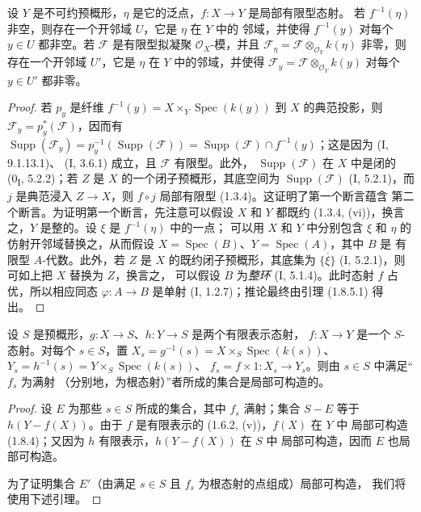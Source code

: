 \begin{corollary}[1.8.6]
\label{IV.1.8.6-fr}
设 $Y$ 是不可约预概形，$\eta$ 是它的泛点，$f:X\to Y$ 是局部有限型态射。
若 $f^{-1}(\eta)$ 非空，则存在一个开邻域 $U$，它是 $\eta$ 在 $Y$ 中的
邻域，并使得 $f^{-1}(y)$ 对每个 $y\in U$ 都非空。若 $\mathscr F$ 是有限型拟凝聚
$\mathcal O_X$-模，并且 $\mathscr F_\eta=\mathscr F\otimes_{\mathcal O_Y}k(\eta)$
非零，则存在一个开邻域 $U'$，它是 $\eta$ 在 $Y$ 中的邻域，并使得
$\mathscr F_y=\mathscr F\otimes_{\mathcal O_Y}k(y)$ 对每个 $y\in U'$ 都非零。
\end{corollary}

\begin{proof}
若 $p_y$ 是纤维 $f^{-1}(y)=X\times_Y\operatorname{Spec}(k(y))$ 到 $X$
的典范投影，则 $\mathscr F_y=p_y^*(\mathscr F)$，因而有
$\operatorname{Supp}(\mathscr F_y)=p_y^{-1}(\operatorname{Supp}(\mathscr F))
=\operatorname{Supp}(\mathscr F)\cap f^{-1}(y)$；这是因为 (I, 9.1.13.1)、
(I, 3.6.1) 成立，且 $\mathscr F$ 有限型。此外，
$\operatorname{Supp}(\mathscr F)$ 在 $X$ 中是闭的 (0\textsubscript{I},
5.2.2)；若 $Z$ 是 $X$ 的一个闭子预概形，其底空间为
$\operatorname{Supp}(\mathscr F)$ (I, 5.2.1)，而 $j$ 是典范浸入
$Z\to X$，则 $f\circ j$ 局部有限型 (1.3.4)。这证明了第一个断言蕴含
第二个断言。为证明第一个断言，先注意可以假设 $X$ 和 $Y$ 都既约
(1.3.4, (vi))，换言之，$Y$ 是整的。设 $\xi$ 是 $f^{-1}(\eta)$ 中的一点；
可以用 $X$ 和 $Y$ 中分别包含 $\xi$ 和 $\eta$ 的仿射开邻域替换之，从而假设
$X=\operatorname{Spec}(B)$、$Y=\operatorname{Spec}(A)$，其中 $B$ 是
有限型 $A$-代数。此外，若 $Z$ 是 $X$ 的既约闭子预概形，其底集为
$\overline{\{\xi\}}$ (I, 5.2.1)，则可如上把 $X$ 替换为 $Z$，换言之，
可以假设 $B$ 为\emph{整环} (I, 5.1.4)。此时态射 $f$ 占优，所以相应同态
$\varphi:A\to B$ 是单射 (I, 1.2.7)；推论最终由引理 (1.8.5.1) 得出。
\end{proof}


\begin{proposition}[1.8.7]
\label{IV.1.8.7-fr}
设 $S$ 是预概形，$g:X\to S$、$h:Y\to S$ 是两个有限表示态射，
$f:X\to Y$ 是一个 $S$-态射。对每个 $s\in S$，置
$X_s=g^{-1}(s)=X\times_S\operatorname{Spec}(k(s))$、
$Y_s=h^{-1}(s)=Y\times_S\operatorname{Spec}(k(s))$、
$f_s=f\times 1:X_s\to Y_s$。则由 $s\in S$ 中满足“$f_s$ 为满射
（分别地，为根态射）”者所成的集合是局部可构造的。
\end{proposition}

\begin{proof}
设 $E$ 为那些 $s\in S$ 所成的集合，其中 $f_s$ 满射；集合 $S-E$ 等于
$h(Y-f(X))$。由于 $f$ 是有限表示的 (1.6.2, (v))，$f(X)$ 在 $Y$ 中
局部可构造 (1.8.4)；又因为 $h$ 有限表示，$h(Y-f(X))$ 在 $S$ 中
局部可构造，因而 $E$ 也局部可构造。

为了证明集合 $E'$（由满足 $s\in S$ 且 $f_s$ 为根态射的点组成）局部可构造，
我们将使用下述引理。
\end{proof}

